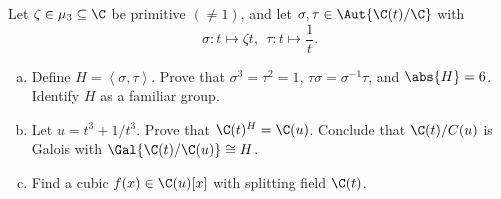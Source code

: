 \documentclass[10pt]{amsart}
\begin{document}
\begin{thm}
  Let $\zeta \in \mu_3 \subseteq \C$ be primitive $(\neq 1)$, and let $\sigma, \tau \in \Aut{\C(t)/\C}$ with
  $$\sigma \colon t \mapsto \zeta t,\ \ \tau \colon t \mapsto \frac{1}{t}.$$
  \begin{enumerate}[(a)]
  \item
    Define $H = \left< \sigma, \tau \right>$.
    Prove that $\sigma^3 = \tau^2 = 1$, $\tau\sigma = \sigma^{-1}\tau$, and $\abs{H} = 6$.
    Identify $H$ as a familiar group.
  \item
    Let $u = t^3 + 1/t^3$.
    Prove that $\C(t)^H = \C(u)$.
    Conclude that $\C(t)/C(u)$ is Galois with $\Gal{\C(t)/\C(u)} \cong H$.
  \item
    Find a cubic $f(x) \in \C(u)[x]$ with splitting field $\C(t)$.
  \end{enumerate}
  

\end{thm}
\end{document}
